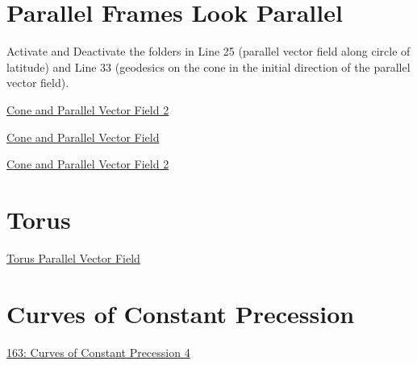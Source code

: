 \documentclass{ximera}
\begin{document}
\section*{Parallel Frames Look Parallel}

Activate and Deactivate the folders in Line 25 (parallel vector field along circle of latitude) and Line 33 (geodesics on the cone in the initial direction of the parallel vector field).

\begin{exploration}
\begin{onlineOnly}
    \begin{center}
\end{center}
\end{onlineOnly}

\href{https://www.desmos.com/3d/ftsbnajcn4}{Cone and Parallel Vector Field 2}
\end{exploration}


\begin{exploration}
\begin{onlineOnly}
    \begin{center}
\end{center}
\end{onlineOnly}

\href{https://www.desmos.com/3d/jzp8zemhz6}{Cone and Parallel Vector Field}
\end{exploration}

\begin{exploration}
\begin{onlineOnly}
    \begin{center}
\end{center}
\end{onlineOnly}

\href{https://www.desmos.com/3d/2w08awnhab}{Cone and Parallel Vector Field 2}
\end{exploration}


\section*{Torus}

\begin{exploration}
\begin{onlineOnly}
    \begin{center}
\end{center}
\end{onlineOnly}

\href{https://www.desmos.com/3d/pkd5ztemml}{Torus Parallel Vector Field}
\end{exploration}



\section*{Curves of Constant Precession}

\begin{exploration}
\begin{onlineOnly}
    \begin{center}
\end{center}
\end{onlineOnly}

\href{https://www.desmos.com/3d/nsifyzlx3p}{163: Curves of Constant Precession 4}
\end{exploration}
\end{document}
